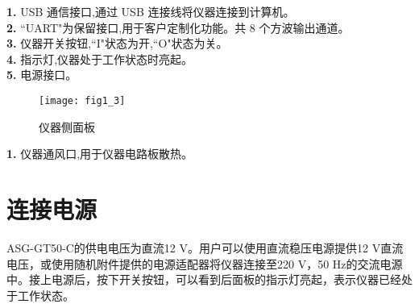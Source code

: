 \noindent \textbf{1.} USB 通信接口,通过 USB 连接线将仪器连接到计算机。\\
\textbf{2.} ``UART"为保留接口,用于客户定制化功能。共 8 个方波输出通道。\\
\textbf{3.} 仪器开关按钮,``I"状态为开,``O"状态为关。\\
\textbf{4.} 指示灯,仪器处于工作状态时亮起。\\
\textbf{5.} 电源接口。

\begin{figure}[ht]
\centering
\texttt{[image: fig1\_3]}
\caption{仪器侧面板}\label{fig:fig1_3}
\end{figure}
\noindent \textbf{1.} 仪器通风口,用于仪器电路板散热。


\section{\heiti 连接电源}
ASG-GT50-C的供电电压为直流12 V。用户可以使用直流稳压电源提供12 V直流电压，或使用随机附件提供的电源适配器将仪器连接至220 V，50 Hz的交流电源中。接上电源后，按下开关按钮，可以看到后面板的指示灯亮起，表示仪器已经处于工作状态。

